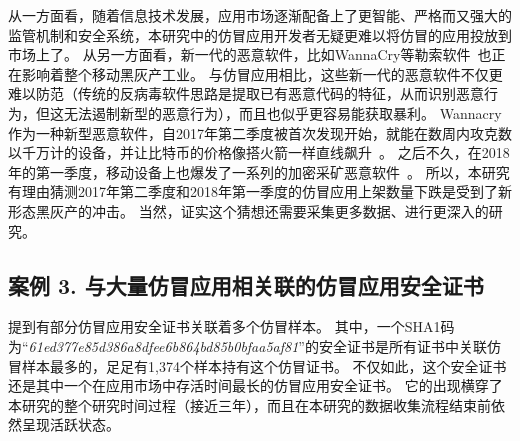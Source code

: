 从一方面看，随着信息技术发展，应用市场逐渐配备上了更智能、严格而又强大的监管机制和安全系统，本研究中的仿冒应用开发者无疑更难以将仿冒的应用投放到市场上了。
从另一方面看，新一代的恶意软件，比如WannaCry等勒索软件~\cite{ransomware}也正在影响着整个移动黑灰产工业。
与仿冒应用相比，这些新一代的恶意软件不仅更难以防范（传统的反病毒软件思路是提取已有恶意代码的特征，从而识别恶意行为，但这无法遏制新型的恶意行为），而且也似乎更容易能获取暴利。
Wannacry作为一种新型恶意软件，自2017年第二季度被首次发现开始，就能在数周内攻克数以千万计的设备，并让比特币的价格像搭火箭一样直线飙升~\cite{wannacry_bitcoin_news}。
之后不久，在2018年的第一季度，移动设备上也爆发了一系列的加密采矿恶意软件~\cite{comodo_report}。
所以，本研究有理由猜测2017年第二季度和2018年第一季度的仿冒应用上架数量下跌是受到了新形态黑灰产的冲击。
当然，证实这个猜想还需要采集更多数据、进行更深入的研究。

\subsection{案例 3. 与大量仿冒应用相关联的仿冒应用安全证书}
\label{sec:case1}

提到有部分仿冒应用安全证书关联着多个仿冒样本。
其中，一个SHA1码为``\emph{61ed377e85d386a8dfee6b864bd85b0bfaa5af81}''的安全证书是所有证书中关联仿冒样本最多的，足足有1,374个样本持有这个仿冒证书。
不仅如此，这个安全证书还是其中一个在应用市场中存活时间最长的仿冒应用安全证书。
它的出现横穿了本研究的整个研究时间过程（接近三年），而且在本研究的数据收集流程结束前依然呈现活跃状态。

